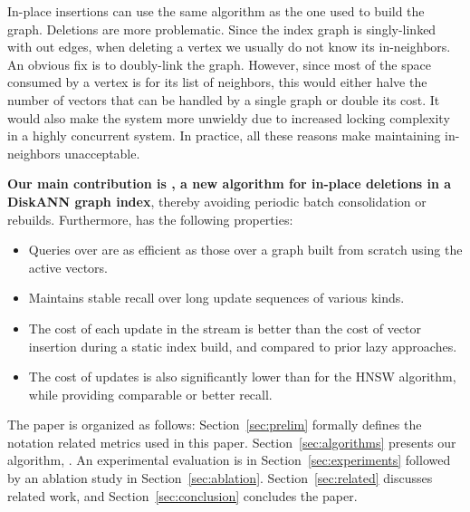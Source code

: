 In-place insertions can use the same algorithm as the one used to build the graph.
Deletions are more problematic.
Since the index graph is singly-linked with out edges,
when deleting a vertex we usually do not know its in-neighbors. 
An obvious fix is to doubly-link the graph. 
However, since most of the space consumed by a vertex is for its list of neighbors, 
this would either halve the number of vectors that can be handled by a single graph or double its cost.
It would also make the system more unwieldy due to increased locking complexity
in a highly concurrent system. In practice, all these reasons make maintaining
in-neighbors unacceptable.


\textbf{Our main contribution is \name, a new algorithm for in-place deletions in a DiskANN graph index},
thereby avoiding periodic batch consolidation or rebuilds. Furthermore, \name has the
following properties:
\begin{itemize}
\item Queries over are as efficient as those over a graph built from scratch using the active vectors.
\item Maintains stable recall over long update sequences of various kinds.
\item The cost of each update in the stream
is better than the cost of vector insertion during a static index build,
and compared to prior lazy approaches.
\item The cost of updates is also significantly lower than for 
the HNSW algorithm, while providing comparable or better recall.
\end{itemize}

The paper is organized as follows:
Section~\ref{sec:prelim} formally defines the notation related metrics used in this paper.
Section~\ref{sec:algorithms} presents our algorithm, \name.
An experimental evaluation is in Section~\ref{sec:experiments} followed by an ablation study in Section~\ref{sec:ablation}.
Section~\ref{sec:related} discusses related work, and Section~\ref{sec:conclusion} concludes the paper.

